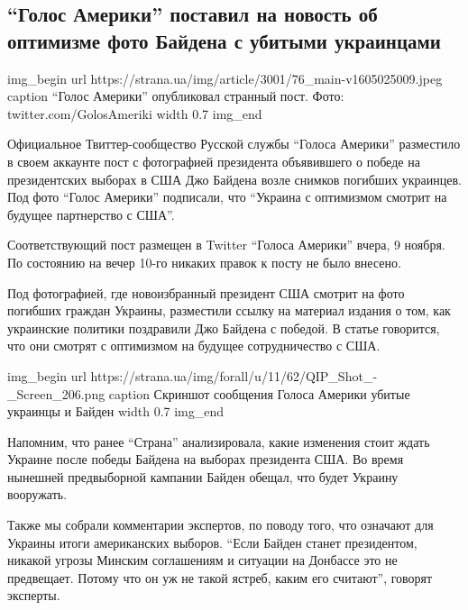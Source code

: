  
 
 

\subsection{\enquote{Голос Америки} поставил на новость об оптимизме фото Байдена с убитыми украинцами}
\label{sec:10_11_2020.news.ua.strana.3.usa_foto_baiden_ukr}

\ifcmt
img_begin 
  url https://strana.ua/img/article/3001/76_main-v1605025009.jpeg
  caption \enquote{Голос Америки} опубликовал странный пост. Фото: twitter.com/GolosAmeriki 
  width 0.7
img_end
\fi

Официальное Твиттер-сообщество Русской службы \enquote{Голоса Америки} разместило в
своем аккаунте пост с фотографией президента объявившего о победе на
президентских выборах в США Джо Байдена возле снимков погибших украинцев. Под
фото \enquote{Голос Америки} подписали, что \enquote{Украина с оптимизмом смотрит на будущее
партнерство с США}.

Соответствующий пост размещен в Twitter \enquote{Голоса Америки} вчера, 9 ноября. По
состоянию на вечер 10-го никаких правок к посту не было внесено.

Под фотографией, где новоизбранный президент США смотрит на фото погибших
граждан Украины, разместили  ссылку на материал издания о том, как украинские
политики поздравили Джо Байдена с победой. В статье говорится, что они смотрят
с оптимизмом на будущее сотрудничество с США.

\ifcmt
img_begin 
  url https://strana.ua/img/forall/u/11/62/QIP_Shot_-_Screen_206.png
  caption Скриншот сообщения Голоса Америки \dshM убитые украинцы и Байден
  width 0.7
img_end
\fi

Напомним, что ранее \enquote{Страна} анализировала, какие изменения стоит ждать Украине
после победы Байдена на выборах президента США. Во время нынешней предвыборной
кампании Байден обещал, что будет Украину вооружать.

Также мы собрали комментарии экспертов, по поводу того, что означают для
Украины итоги американских выборов. \enquote{Если Байден станет президентом, никакой
угрозы Минским соглашениям и ситуации на Донбассе это не предвещает. Потому что
он уж не такой ястреб, каким его считают}, \dshM говорят эксперты.
